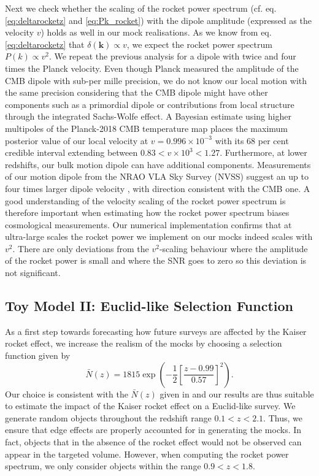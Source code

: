 \documentclass[a4paper,11pt]{article}
\begin{document}
Next we check whether the scaling of the rocket power spectrum (cf. eq. \eqref{eq:deltarocketz} and \eqref{eq:Pk_rocket}) with the dipole amplitude (expressed as the velocity $v$) holds as well in our mock realisations. As we know from eq. \eqref{eq:deltarocketz} that $\delta(\mathbf{k})\propto v$, we expect the rocket power spectrum $P(k)\propto v^2$. We repeat the previous analysis for a dipole with twice and four times the Planck velocity. Even though Planck measured the amplitude of the CMB dipole with sub-per mille precision, we do not know our local motion with the same precision considering that the CMB dipole might have other components such as a primordial dipole or contributions from local structure through the integrated Sachs-Wolfe effect. A Bayesian estimate \cite{Saha:2021bay} using higher multipoles of the Planck-2018 CMB temperature map places the maximum posterior value of our local velocity at $v = 0.996 \times 10^{-3}$ with its 68 per cent credible interval extending between $0.83<v\times 10^3 < 1.27$. Furthermore, at lower redshifts, our bulk motion dipole can have additional components. Measurements of our motion dipole from the NRAO VLA Sky Survey (NVSS) suggest an up to four times larger dipole velocity \cite{Blake:2002gx,Singal:2011dy,Gibelyou:2012ri,Rubart:2013tx,Kothari:2013gya,Tiwari:2013ima,Tiwari:2015tba,Siewert:2020krp}, with  direction consistent with the CMB one. A good understanding of the velocity scaling of the rocket power spectrum is therefore important when estimating how the rocket power spectrum biases cosmological measurements.
Our numerical implementation confirms that at ultra-large scales the rocket power we implement on our mocks indeed scales with $v^2$. There are only deviations from the $v^2$-scaling behaviour where the amplitude of the rocket power is small and where the SNR goes to zero so this deviation is not significant. 

\subsection{Toy Model II: Euclid-like Selection Function}
\label{sec:Euclid_toy}

As a first step towards forecasting how future surveys are affected by the Kaiser rocket effect, we increase the realism of the mocks  by choosing a selection function given by
\begin{equation}
       \bar N(z) = 1815\exp\left(-\frac{1}{2}\left[\frac{z-0.99}{0.57}\right]^2\right).
    \label{eq:dNdOmdz_model}
\end{equation}
Our choice is consistent with the $\bar N(z)$ given in \cite{Blanchard:2019oqi} and our results are thus suitable to estimate the impact of the Kaiser rocket effect on a Euclid-like survey.
We generate random objects throughout the redshift range $0.1 < z < 2.1$. Thus, we ensure that edge effects are properly accounted for in generating the mocks. In fact, objects that in the absence of the rocket effect would not be observed can appear in the targeted volume. However, when computing the rocket power spectrum, we only consider objects within the range $0.9 < z < 1.8$. 
\end{document}
